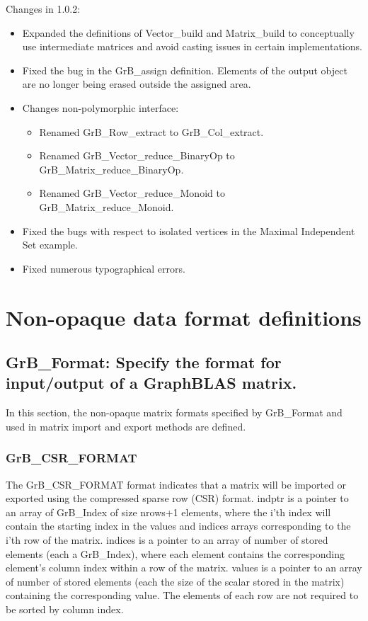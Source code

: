 Changes in 1.0.2:
\begin{itemize}
\item Expanded the definitions of {\sf Vector\_build} and {\sf Matrix\_build} to conceptually use intermediate matrices and avoid casting issues in certain implementations.
\item Fixed the bug in the {\sf GrB\_assign} definition. Elements of the output object are no longer being erased outside the assigned area.
\item Changes non-polymorphic interface:
    \begin{itemize}
    \item Renamed {\sf GrB\_Row\_extract} to {\sf GrB\_Col\_extract}.
    \item Renamed {\sf GrB\_Vector\_reduce\_BinaryOp} to {\sf GrB\_Matrix\_reduce\_BinaryOp}.
    \item Renamed {\sf GrB\_Vector\_reduce\_Monoid} to {\sf GrB\_Matrix\_reduce\_Monoid}.
    \end{itemize}
\item Fixed the bugs with respect to isolated vertices in the Maximal Independent Set example.
\item Fixed numerous typographical errors.
\end{itemize}


\chapter{Non-opaque data format definitions}
\label{App:Matrix_format_details}

\section{{\sf GrB\_Format}: Specify the format for input/output of a GraphBLAS matrix.}

In this section, the non-opaque matrix formats specified by {\sf GrB\_Format} and used
in matrix import and export methods are defined.

\subsection{{\sf GrB\_CSR\_FORMAT}}

The {\sf GrB\_CSR\_FORMAT} format indicates that a matrix will be imported or
exported using the compressed sparse row (CSR) format.  {\sf indptr} is a 
pointer to an array of {\sf GrB\_Index} of size nrows+1 elements, where
the i'th index will contain the starting index in the {\sf values}
and {\sf indices} arrays corresponding to the i'th row of the matrix.
{\sf indices} is a pointer to an array of number of
stored elements (each a {\sf GrB\_Index}), where each element contains the 
corresponding element's column index within a row of the matrix.
{\sf values} is a pointer to an array of number of
stored elements (each the size of the scalar stored in the matrix) containing 
the corresponding value.  The 
elements of each row are not required to be sorted by column index.

